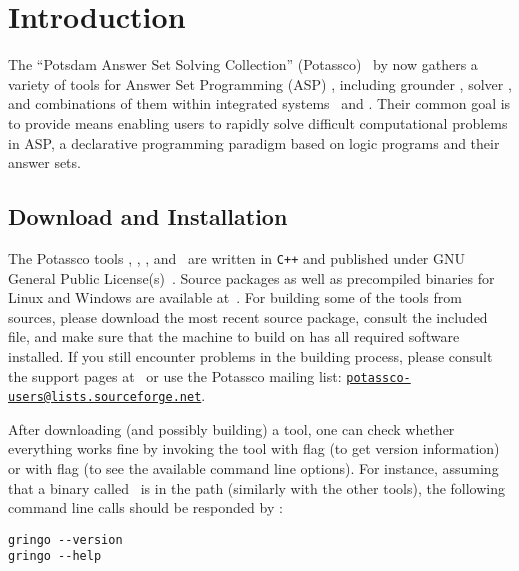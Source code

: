 \section{Introduction}\label{sec:introduction}

The ``Potsdam Answer Set Solving Collection'' (Potassco)~\cite{potassco}
by now gathers a variety of tools for Answer Set Programming (ASP)
\cite{ankolisc05a,baral03a,gelfond08a,gelleo02a,lifschitz02a,martru99a,niemela99a},
including grounder \gringo, solver \clasp, and
combinations of them within integrated systems \clingo\ and \iclingo.
Their common goal is to provide means enabling users 
to rapidly solve difficult computational problems in ASP,
a declarative programming paradigm based on
logic programs and their answer sets.

\subsection{Download and Installation}

The Potassco tools \gringo, \clasp, \clingo, and \iclingo\
are written in \texttt{C++} and published under GNU General Public License(s)~\cite{GNUgpl}.
Source packages as well as precompiled binaries for Linux and Windows
are available at~\cite{potassco}.
For building some of the tools from sources,
please download the most recent source package, consult the
included  %
file,
and make sure that the machine to build on has all
required software installed.
If you still encounter problems in the building process,
please 
consult the support pages at~\cite{potassco}
or use the Potassco mailing list:
\href{mailto:potassco-users@lists.sourceforge.net}{\texttt{potassco-users@lists.sourceforge.net}}.

After downloading (and possibly building) a tool,
one can check whether everything works fine by invoking the tool
with flag \code{--version} (to get version information) or
with flag  (to see the available command line options).
For instance, assuming that a binary called \gringo\ is in the path
(similarly with the other tools),
the following command line calls should be responded by \gringo:
%
\begin{lstlisting}[numbers=none]
gringo --version
gringo --help
\end{lstlisting}

